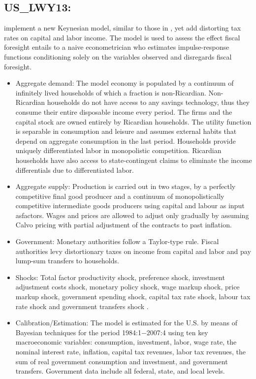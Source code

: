\documentclass[11pt,a4paper]{article}
\begin{document}
	\subsection{US\_LWY13: \cite{leeper2013fiscal}}
	\label{USLWY13}
	\cite{leeper2013fiscal} implement a new Keynesian model, similar to those in \cite{SmetsWouters2007,SmetsWouters2003}, yet add distorting tax rates on capital and labor income. The model is used to assess the effect fiscal foresight entails to a naive econometrician who estimates impulse-response functions conditioning solely on the variables observed and disregards fiscal foresight. 
	\begin{itemize}
		\item Aggregate demand: The model economy is populated by a continuum of infinitely lived households of which a fraction is non-Ricardian. Non-Ricardian households do not have access to any savings technology, thus they consume their entire disposable income every period. The firms and the capital stock are owned entirely by Ricardian households. The utility function is separable in consumption and leisure and assumes external habits that depend on aggregate consumption in the last period. Households provide uniquely differentiated labor in monopolistic competition. Ricardian households have also access to state-contingent claims to eliminate the income differentials due to differentiated labor. 
		
		\item Aggregate supply: Production is carried out in two stages, by a perfectly competitive final good producer and a continuum of monopolistically competitive intermediate goods producers using capital and labour as input asfactors. Wages and prices are allowed to adjust only gradually by assuming  Calvo pricing with partial adjustment of the contracts to past inflation. 
		
		\item Government: Monetary authorities follow a Taylor-type rule. Fiscal authorities levy distortionary taxes on income from capital and labor and pay lump-sum transfers to households.
		
		\item Shocks: Total factor productivity shock, preference shock, investment adjustment costs shock, monetary policy shock, wage markup shock, price markup shock, government spending shock, capital tax rate shock, labour tax rate shock and government transfers shock .
		
		\item Calibration/Estimation: The model is estimated for the U.S. by means of Bayesian techniques for the period 1984:1$-$2007:4 using ten key macroeconomic variables: consumption, investment, labor, wage rate, the nominal interest rate, inflation, capital tax revenues, labor tax revenues, the sum of real government consumption and investment, and government transfers. Government data include all federal, state, and local levels.
		

\end{itemize}
\end{document}
